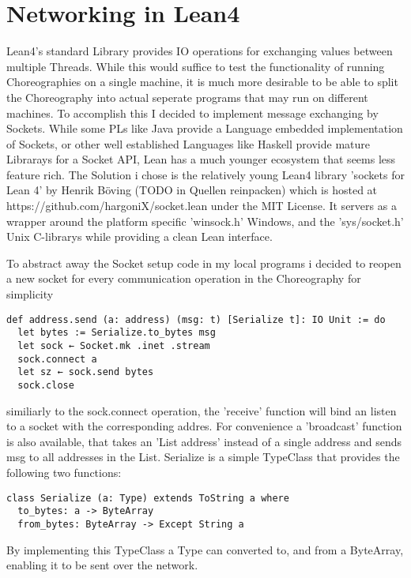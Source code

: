 \section{Networking in Lean4}
Lean4's standard Library provides IO operations for exchanging values between multiple Threads. While this would suffice to test the functionality of running Choreographies on a single machine, it is much more desirable to be able to split the Choreography into actual seperate programs that may run on different machines. To accomplish this I decided to implement message exchanging by Sockets.
While some PLs like Java provide a Language embedded implementation of Sockets, or other well established Languages like Haskell provide mature Librarays for a Socket API, Lean has a much younger ecosystem that seems less feature rich. The Solution i chose is the relatively young Lean4 library 'sockets for Lean 4' by Henrik Böving (TODO in Quellen reinpacken) which is hosted at https://github.com/hargoniX/socket.lean under the MIT License. It servers as a wrapper around the platform specific 'winsock.h' Windows, and the 'sys/socket.h' Unix C-librarys while providing a clean Lean interface.
\par
To abstract away the Socket setup code in my local programs i decided to reopen a new socket for every communication operation in the Choreography for simplicity

\begin{lstlisting}[language=lean]
def address.send (a: address) (msg: t) [Serialize t]: IO Unit := do
  let bytes := Serialize.to_bytes msg
  let sock ← Socket.mk .inet .stream
  sock.connect a
  let sz ← sock.send bytes
  sock.close
\end{lstlisting}

similiarly to the sock.connect operation, the 'receive' function will bind an listen to a socket with the corresponding addres. For convenience a 'broadcast' function is also available, that takes an 'List address' instead of a single address and sends msg to all addresses in the List.
\newline
Serialize is a simple TypeClass that provides the following two functions:
\begin{lstlisting}[language=lean]
class Serialize (a: Type) extends ToString a where
  to_bytes: a -> ByteArray
  from_bytes: ByteArray -> Except String a
\end{lstlisting}
By implementing this TypeClass a Type can converted to, and from a ByteArray, enabling it to be sent over the network.


